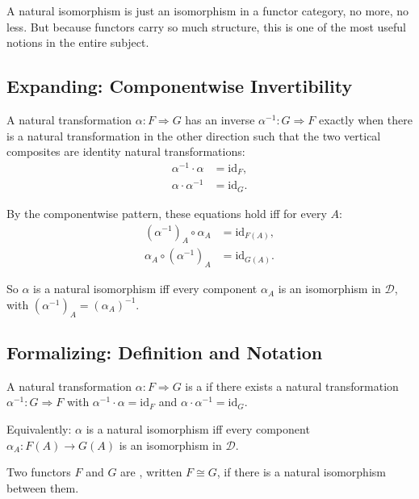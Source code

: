 A natural isomorphism is just an isomorphism in a functor category, no more,
no less. But because functors carry so much structure, this is one of the
most useful notions in the entire subject.

\subsection{Expanding: Componentwise Invertibility}

A natural transformation $\alpha : F \Rightarrow G$ has an inverse
$\alpha^{-1} : G \Rightarrow F$ exactly when there is a natural
transformation in the other direction such that the two vertical composites
are identity natural transformations:
\begin{align*}
  \alpha^{-1} \cdot \alpha &= \mathrm{id}_F, \\
  \alpha \cdot \alpha^{-1} &= \mathrm{id}_G.
\end{align*}

By the componentwise pattern, these equations hold iff for every $A$:
\begin{align*}
  (\alpha^{-1})_A \circ \alpha_A &= \mathrm{id}_{F(A)}, \\
  \alpha_A \circ (\alpha^{-1})_A &= \mathrm{id}_{G(A)}.
\end{align*}

So $\alpha$ is a natural isomorphism iff every component $\alpha_A$ is an
isomorphism in $\mathcal{D}$, with $(\alpha^{-1})_A = (\alpha_A)^{-1}$.

\subsection{Formalizing: Definition and Notation}

A natural transformation $\alpha : F \Rightarrow G$ is a  if there exists a natural transformation $\alpha^{-1} :
G \Rightarrow F$ with $\alpha^{-1} \cdot \alpha = \mathrm{id}_F$ and
$\alpha \cdot \alpha^{-1} = \mathrm{id}_G$.

Equivalently: $\alpha$ is a natural isomorphism iff every component
$\alpha_A : F(A) \to G(A)$ is an isomorphism in $\mathcal{D}$.

Two functors $F$ and $G$ are , written
$F \cong G$, if there is a natural isomorphism between them.

